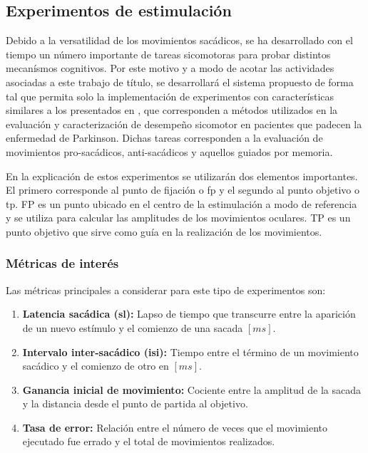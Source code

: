 \documentclass[../main.tex]{subfiles}
\begin{document}
		\vspace{-10mm}
		\subsection{Experimentos de estimulación}
		\label{sub:02_experimentos_de_estimulacion}
			Debido a la versatilidad de los movimientos sacádicos, se ha desarrollado con el tiempo un número importante de tareas sicomotoras para probar distintos mecanísmos cognitivos. Por este motivo y a modo de acotar las actividades asociadas a este trabajo de título, se desarrollará el sistema propuesto de forma tal que permita solo la implementación de experimentos con características similares a los presentados en \cite{article:tests_1, article:tests_2, article:tests_3, article:tests_4}, que corresponden a métodos utilizados en la evaluación y caracterización de desempeño sicomotor en pacientes que padecen la enfermedad de Parkinson. Dichas tareas corresponden a la evaluación de movimientos pro-sacádicos, anti-sacádicos y aquellos guiados por memoria.

			En la explicación de estos experimentos se utilizarán dos elementos importantes. El primero corresponde al punto de fijación o \acrshort{fp} y el segundo al punto objetivo o \acrshort{tp}. FP es un punto ubicado en el centro de la estimulación a modo de referencia y se utiliza para calcular las amplitudes de los movimientos oculares. TP es un punto objetivo que sirve como guía en la realización de los movimientos. 

			\vspace{-5mm}
			\subsubsection{Métricas de interés}
			\label{ssub:metricas_de_interes}
				Las métricas principales a considerar para este tipo de experimentos son:
				\begin{enumerate}\setlength\itemsep{-0.2em}
				 	\item \textbf{Latencia sacádica (\acrshort{sl}):} Lapso de tiempo que transcurre entre la aparición de un nuevo estímulo y el comienzo de una sacada $[ms]$. 

				 	\item \textbf{Intervalo inter-sacádico (\acrshort{isi}):} Tiempo entre el término de un movimiento sacádico y el comienzo de otro en $[ms]$.
				 	
				 	\item \textbf{Ganancia inicial de movimiento:} Cociente entre la amplitud de la sacada y la distancia desde el punto de partida al objetivo. 
				 	
				 	\item \textbf{Tasa de error:} Relación entre el número de veces que el movimiento ejecutado fue errado y el total de movimientos realizados. 

				 \end{enumerate} 
\end{document}
